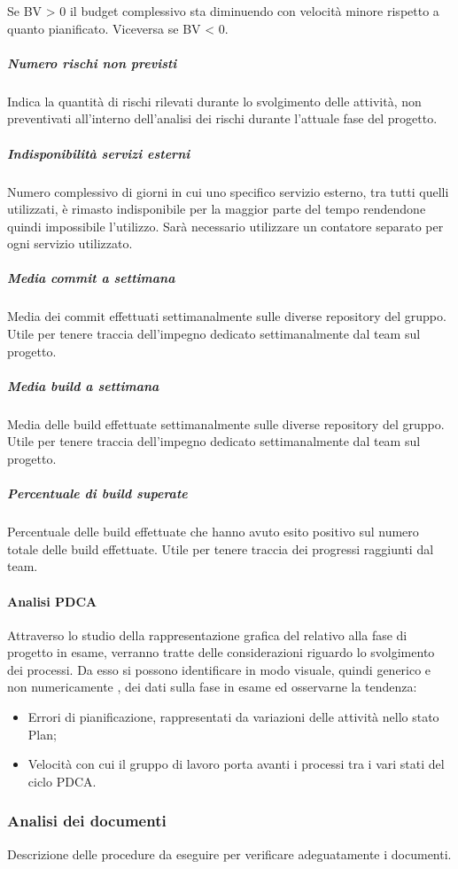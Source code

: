 Se BV > 0 il budget complessivo sta diminuendo con velocità minore rispetto a quanto pianificato. Viceversa se BV < 0.
\subparagraph{Numero rischi non previsti}\Spazio
Indica la quantità di rischi rilevati durante lo svolgimento delle attività, non preventivati all'interno dell'analisi dei rischi durante l'attuale fase del progetto.
\subparagraph{Indisponibilità servizi esterni}\Spazio
Numero complessivo di giorni in cui uno specifico servizio esterno, tra tutti quelli utilizzati, è rimasto indisponibile per la maggior parte del tempo rendendone quindi impossibile l'utilizzo. Sarà necessario utilizzare un contatore separato per ogni servizio utilizzato.
\subparagraph{Media commit a settimana}\Spazio
Media dei commit effettuati settimanalmente sulle diverse repository del gruppo. Utile per tenere traccia dell'impegno dedicato settimanalmente dal team sul progetto.
\subparagraph{Media build a settimana}\Spazio
Media delle build effettuate settimanalmente sulle diverse repository del gruppo. Utile per tenere traccia dell'impegno dedicato settimanalmente dal team sul progetto.
\subparagraph{Percentuale di build superate}\Spazio
Percentuale delle build effettuate che hanno avuto esito positivo sul numero totale delle build effettuate. Utile per tenere traccia dei progressi raggiunti dal team.

\paragraph{Analisi PDCA} \Spazio
Attraverso lo studio della rappresentazione grafica del  relativo alla fase di progetto in esame, verranno tratte delle considerazioni riguardo lo svolgimento dei processi.
Da esso si possono identificare in modo visuale, quindi generico e non numericamente , dei dati sulla fase in esame ed osservarne la tendenza:
\begin{itemize}
	\item Errori di pianificazione, rappresentati da variazioni delle attività nello stato
	Plan;
	\item Velocità con cui il gruppo di lavoro porta avanti i processi tra i vari stati del
	ciclo PDCA.
\end{itemize}



\subsubsection{Analisi dei documenti}
 Descrizione delle procedure da eseguire per verificare adeguatamente i documenti.
